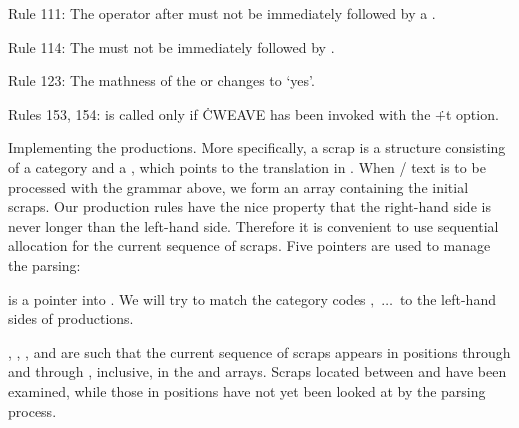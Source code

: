 Rule 111: The operator after 
must not be immediately followed by a .

Rule 114: The  must not be immediately followed by
.

Rule 123: The mathness of the  or  changes to `yes'.

Rules 153, 154:  is called only if \.{CWEAVE} has been
invoked
with the \.{+t} option.

\endgroup

\fi

Implementing the productions.
More specifically, a scrap is a structure consisting of a category
 and a  , which points to the
translation in
.  When \CEE/ text is to be processed with the grammar
above,
we form an array  containing the initial scraps.
Our production rules have the nice property that the right-hand side is never
longer than the left-hand side. Therefore it is convenient to use sequential
allocation for the current sequence of scraps. Five pointers are used to
manage the parsing:

\yskip\hang {} is a pointer into .  We will try to
match
the category codes $,\,\,%
\ldots\,$
to the left-hand sides of productions.

\yskip\hang {}, , , and  are such that
the current sequence of scraps appears in positions 
through
 and  through , inclusive,
in the  and
 arrays. Scraps located between  and  have
been examined, while those in positions  have not yet been
looked at by the parsing process.

